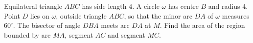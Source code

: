 Equilateral triangle $ABC$ has side length $4$. A circle $\omega$ has centre $B$ and radius $4$. Point $D$ lies on $\omega$, outside triangle $ABC$, so that the minor arc $DA$ of $\omega$ measures $60^\circ$. The bisector of angle $DBA$ meets arc $DA$ at $M$. Find the area of the region bounded by arc $MA$, segment $AC$ and segment $MC$.
